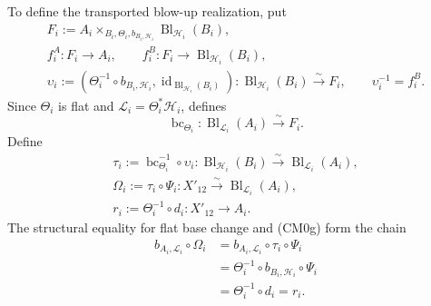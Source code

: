 \begin{definition}
\begin{enumerate}
      To define the transported blow-up realization, put
      \[
      \begin{gathered}
        F_i:=A_i\times_{B_i,\Theta_i,b_{B_i,\mathcal H_i}}
          \operatorname{Bl}_{\mathcal H_i}(B_i),\\
        f_i^A\colon F_i\to A_i,\qquad
        f_i^B\colon F_i\to\operatorname{Bl}_{\mathcal H_i}(B_i),\\
        \upsilon_i:=
          (\Theta_i^{-1}\circ b_{B_i,\mathcal H_i},
            \operatorname{id}_{\operatorname{Bl}_{\mathcal H_i}(B_i)})
          \colon\operatorname{Bl}_{\mathcal H_i}(B_i)
            \xrightarrow{\sim}F_i,
        \qquad \upsilon_i^{-1}=f_i^B.
      \end{gathered}
      \]
      Since \(\Theta_i\) is flat and
      \(\mathcal L_i=\Theta_i^*\mathcal H_i\),
       defines
      \[
        \operatorname{bc}_{\Theta_i}\colon
          \operatorname{Bl}_{\mathcal L_i}(A_i)
            \xrightarrow{\sim}F_i.
      \]
      Define
      \[
      \begin{gathered}
        \tau_i:=\operatorname{bc}_{\Theta_i}^{-1}\circ\upsilon_i
          \colon\operatorname{Bl}_{\mathcal H_i}(B_i)
            \xrightarrow{\sim}\operatorname{Bl}_{\mathcal L_i}(A_i),\\
        \Omega_i:=\tau_i\circ\Psi_i
          \colon X'_{12}\xrightarrow{\sim}
            \operatorname{Bl}_{\mathcal L_i}(A_i),\\
        r_i:=\Theta_i^{-1}\circ d_i\colon X'_{12}\longrightarrow A_i.
      \end{gathered}
      \]
      The structural equality for flat base change and (CM0g) form the chain
      \[
      \begin{aligned}
        b_{A_i,\mathcal L_i}\circ\Omega_i
          &=b_{A_i,\mathcal L_i}\circ\tau_i\circ\Psi_i\\
          &=\Theta_i^{-1}\circ b_{B_i,\mathcal H_i}\circ\Psi_i\\
          &=\Theta_i^{-1}\circ d_i=r_i.
      \end{aligned}                                                \tag{CM0j}
      \]


\end{enumerate}
\end{definition}
